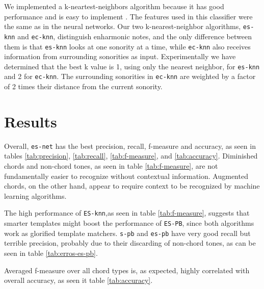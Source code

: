 \documentclass{article}
\begin{document}
We implemented a k-neartest-neighbors algorithm because it has good
performance and is easy to implement \cite{fix.ea:important,
  gomez.ea:estimating}. The features used in this classifier were the
same as in the neural networks. Our two k-nearest-neighbor algorithms,
\texttt{es-knn} and \texttt{ec-knn}, distinguish enharmonic notes, and
the only difference between them is that \texttt{es-knn} looks at one
sonority at a time, while \texttt{ec-knn} also receives information
from surrounding sonorities as input. Experimentally we have
determined that the best k value is 1, using only the nearest
neighbor, for \texttt{es-knn} and 2 for \texttt{ec-knn}. The
surrounding sonorities in \texttt{ec-knn} are weighted by a factor of
2 times their distance from the current sonority.

\section{Results}
\label{sec:discussion}


Overall, \texttt{es-net} has the best precision, recall, f-measure and
accuracy, as seen in tables \ref{tab:precision}, \ref{tab:recall},
\ref{tab:f-measure}, and \ref{tab:accuracy}. Diminished chords and
non-chord tones, as seen in table \ref{tab:f-measure}, are not
fundamentally easier to recognize without contextual
information. Augmented chords, on the other hand, appear to require
context to be recognized by machine learning algorithms.

The high performance of \texttt{ES-knn},as seen in table
\ref{tab:f-measure}, suggests that smarter templates might boost the
performance of \texttt{ES-PB}, since both algorithms work as glorified
template matchers. \texttt{s-pb} and \texttt{es-pb} have very good
recall but terrible precision, probably due to their discarding of
non-chord tones, as can be seen in table \ref{tab:erros-es-pb}. 

Averaged f-measure over all chord types is, as expected, highly
correlated with overall accuracy, as seen it table \ref{tab:accuracy}.
\end{document}
